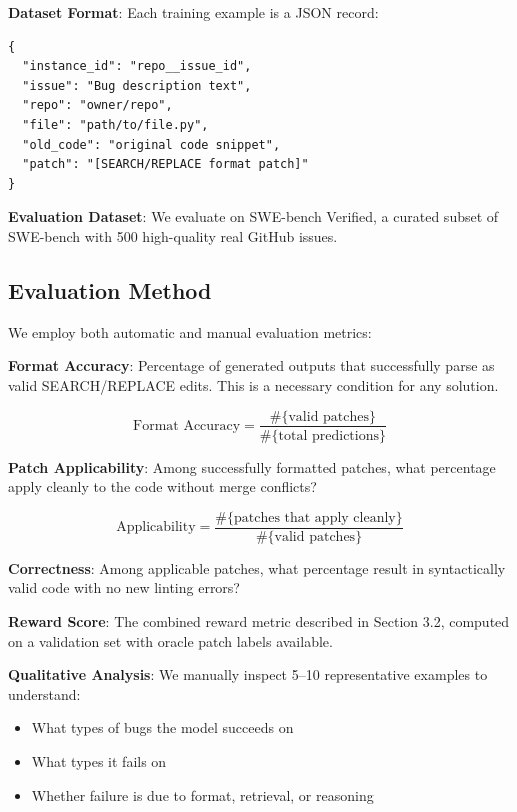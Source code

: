 \documentclass{article} %
\begin{document}
\textbf{Dataset Format}: Each training example is a JSON record:
\begin{verbatim}
{
  "instance_id": "repo__issue_id",
  "issue": "Bug description text",
  "repo": "owner/repo",
  "file": "path/to/file.py",
  "old_code": "original code snippet",
  "patch": "[SEARCH/REPLACE format patch]"
}
\end{verbatim}

\textbf{Evaluation Dataset}: We evaluate on SWE-bench Verified, a curated subset of SWE-bench with 500 high-quality real GitHub issues.

\subsection{Evaluation Method}

We employ both automatic and manual evaluation metrics:

\textbf{Format Accuracy}: Percentage of generated outputs that successfully parse as valid SEARCH/REPLACE edits. This is a necessary condition for any solution.

\begin{equation}
\text{Format Accuracy} = \frac{\#\{\text{valid patches}\}}{\#\{\text{total predictions}\}}
\end{equation}

\textbf{Patch Applicability}: Among successfully formatted patches, what percentage apply cleanly to the code without merge conflicts?

\begin{equation}
\text{Applicability} = \frac{\#\{\text{patches that apply cleanly}\}}{\#\{\text{valid patches}\}}
\end{equation}

\textbf{Correctness}: Among applicable patches, what percentage result in syntactically valid code with no new linting errors?

\textbf{Reward Score}: The combined reward metric described in Section 3.2, computed on a validation set with oracle patch labels available.

\textbf{Qualitative Analysis}: We manually inspect 5--10 representative examples to understand:
\begin{itemize}
    \item What types of bugs the model succeeds on
    \item What types it fails on
    \item Whether failure is due to format, retrieval, or reasoning
\end{itemize}
\end{document}

